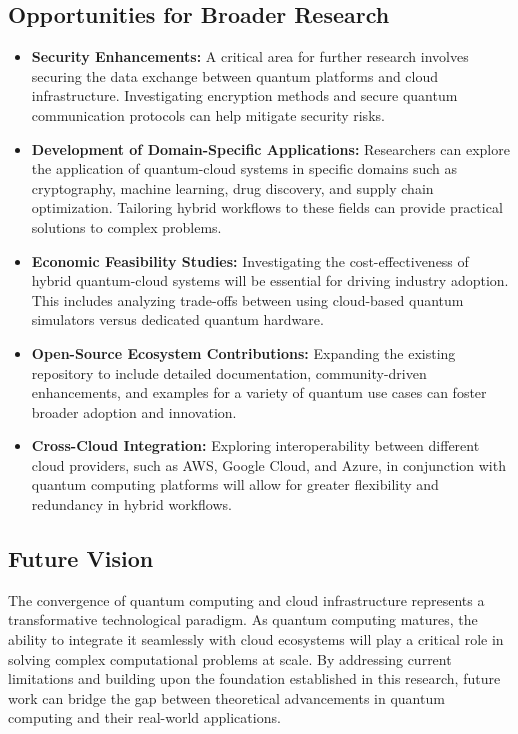 \documentclass[conference]{IEEEtran}
\begin{document}
\subsection{Opportunities for Broader Research}

\begin{itemize}
    \item \textbf{Security Enhancements:} A critical area for further research involves securing the data exchange between quantum platforms and cloud infrastructure. Investigating encryption methods and secure quantum communication protocols can help mitigate security risks.

    \item \textbf{Development of Domain-Specific Applications:} Researchers can explore the application of quantum-cloud systems in specific domains such as cryptography, machine learning, drug discovery, and supply chain optimization. Tailoring hybrid workflows to these fields can provide practical solutions to complex problems.

    \item \textbf{Economic Feasibility Studies:} Investigating the cost-effectiveness of hybrid quantum-cloud systems will be essential for driving industry adoption. This includes analyzing trade-offs between using cloud-based quantum simulators versus dedicated quantum hardware.

    \item \textbf{Open-Source Ecosystem Contributions:} Expanding the existing repository to include detailed documentation, community-driven enhancements, and examples for a variety of quantum use cases can foster broader adoption and innovation.

    \item \textbf{Cross-Cloud Integration:} Exploring interoperability between different cloud providers, such as AWS, Google Cloud, and Azure, in conjunction with quantum computing platforms will allow for greater flexibility and redundancy in hybrid workflows.
\end{itemize}

\subsection{Future Vision}

The convergence of quantum computing and cloud infrastructure represents a transformative technological paradigm. As quantum computing matures, the ability to integrate it seamlessly with cloud ecosystems will play a critical role in solving complex computational problems at scale. By addressing current limitations and building upon the foundation established in this research, future work can bridge the gap between theoretical advancements in quantum computing and their real-world applications.
\end{document}
